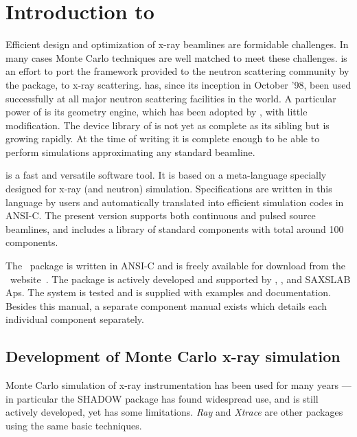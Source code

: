 
\chapter{Introduction to \MCX}

Efficient design and optimization of x-ray beamlines are
formidable challenges. In many cases Monte Carlo techniques are well matched to meet
these challenges. 
\MCX is an effort to port the framework provided to the neutron scattering
community by the \MCS package, to x-ray scattering. \MCS has, since its
inception in October '98, been used successfully at all major neutron
scattering facilities in the world. A particular power of \MCS is its geometry
engine, which has been adopted by \MCX, with little modification. The device
library of \MCX is not yet as complete as its sibling \MCS but is growing
rapidly.
At the time of writing it is complete enough to be able to perform simulations
approximating any standard beamline.

\MCX is a fast and versatile software tool.
It is based on a meta-language specially designed for x-ray (and neutron)
simulation. Specifications are written in this language by users and
automatically translated into efficient simulation codes in ANSI-C.
The present version supports both continuous and pulsed source beamlines, and includes a library of standard
components with total around 100 components.

The \MCX\ package is written in ANSI-C and is freely available for download
from the \MCX\ website~\cite{mcxtrace_webpage}. The package is actively
developed and supported by \DTUPhyslong, \NBIlong, \ESRFlong and SAXSLAB Aps.
The system is tested and is supplied with examples and documentation.
Besides this manual, a separate component manual exists which details each individual component separately.

\section{Development of Monte Carlo x-ray simulation}
Monte Carlo simulation of x-ray instrumentation has been used for many years --- in particular the SHADOW package 
\cite{welnak1994shadow,sanchez2011shadow3}
has found widespread use, and is still actively developed, yet has some
limitations. \emph{Ray}\cite{schaefers2008bessy} and \emph{Xtrace}\cite{bauer2007simulation} are other packages using the same
basic techniques. 

